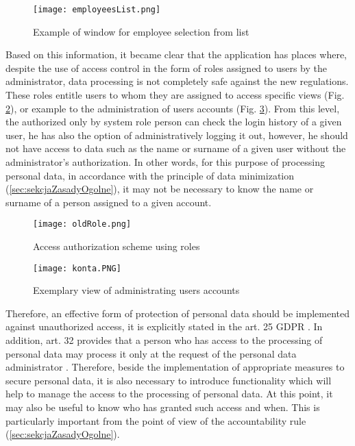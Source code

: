 \documentclass[en, noamssymb]{mgr}
\begin{document}
\begin{figure}[]
	\centering
	\texttt{[image: employeesList.png]}
	\caption[Example window for employee selection from list]{Example of window for employee selection from list}
	\label{fig:employeesPopup}
\end{figure}

Based on this information, it became clear that the application has places where, despite the use of access control in the form of roles assigned to users by the administrator, data processing is not completely safe against the new regulations. These roles entitle users to whom they are assigned to access specific views (Fig. \ref{fig:oldRole}), or example to the administration of users accounts (Fig. \ref{fig:accountsAdministration}). From this level, the authorized only by system role person can check the login history of a given user, he has also the option of administratively logging it out, however, he should not have access to data such as the name or surname of a given user without the administrator's authorization. In other words, for this purpose of processing personal data, in accordance with the principle of data minimization (\ref{sec:sekcjaZasadyOgolne}), it may not be necessary to know the name or surname of a person assigned to a given account.

\begin{figure}[]
	\centering
	\texttt{[image: oldRole.png]}
	\caption[Access authorization scheme using roles]{Access authorization scheme using roles}
	\label{fig:oldRole}
\end{figure}

\begin{figure}[H]
	\centering
	\texttt{[image: konta.PNG]}
	\caption[Exemplary view of administrating users accounts]{Exemplary view of administrating users accounts}
	\label{fig:accountsAdministration}
\end{figure}

Therefore, an effective form of protection of personal data should be implemented against unauthorized access, it is explicitly stated in the art. 25 GDPR \cite{rodo_art25}. In addition, art. 32 provides that a person who has access to the processing of personal data may process it only at the request of the personal data administrator \cite{rodo_art32}. Therefore, beside the implementation of appropriate measures to secure personal data, it is also necessary to introduce functionality which will help to manage the access to the processing of personal data. At this point, it may also be useful to know who has granted such access and when. This is particularly important from the point of view of the accountability rule (\ref{sec:sekcjaZasadyOgolne}). 
\end{document}
